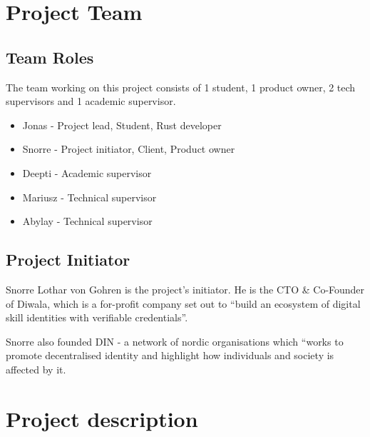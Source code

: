 \hypertarget{project-team}{%
\section{Project Team}\label{project-team}}

\hypertarget{team-roles}{%
\subsection{Team Roles}\label{team-roles}}

The team working on this project consists of 1 student, 1 product
owner, 2 tech supervisors and 1 academic supervisor.

\begin{itemize}
\tightlist
\item
    Jonas - Project lead, Student, Rust developer
\item
    Snorre - Project initiator, Client, Product owner
\item
    Deepti - Academic supervisor
\item
    Mariusz - Technical supervisor
\item
    Abylay - Technical supervisor
\end{itemize}


\hypertarget{project-initiator}{%
\subsection{Project Initiator}\label{project-initiator}}

Snorre Lothar von Gohren is the project's initiator. He is the CTO \& Co-Founder of Diwala, which is a for-profit company set out to ``build an ecosystem of digital skill identities with verifiable credentials''.

Snorre also founded DIN - a network of nordic organisations which ``works to
promote decentralised identity and highlight how individuals and society
is affected by it.



\pagebreak



\hypertarget{project-description}{%
\section{Project description}\label{project-description}}

